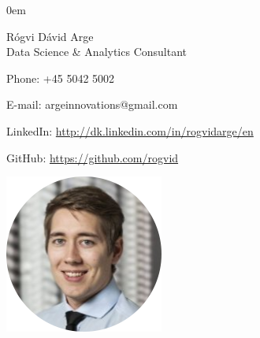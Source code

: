\documentclass[10pt,a4paper]{article}
\begin{document}
\parindent0em
\begin{minipage}[t]{0.5\linewidth}
\vspace{-3.85cm}
{\Huge Rógvi Dávid Arge }\\

{\Large Data Science \& Analytics Consultant}
\vspace{0.3cm}

Phone: +45 5042 5002

\vspace{0.1cm}
E-mail: argeinnovations@gmail.com

\vspace{0.1cm}
LinkedIn: \url{http://dk.linkedin.com/in/rogvidarge/en}

\vspace{0.1cm}
GitHub: \url{https://github.com/rogvid}\\
\vspace{-1.6cm}
\end{minipage}\hspace{0.1cm}
\hfill\begin{minipage}[t]{0.3\linewidth}\raggedleft
    \includegraphics[width=0.7\columnwidth]{workpicture.png}
\end{minipage}
\end{document}
